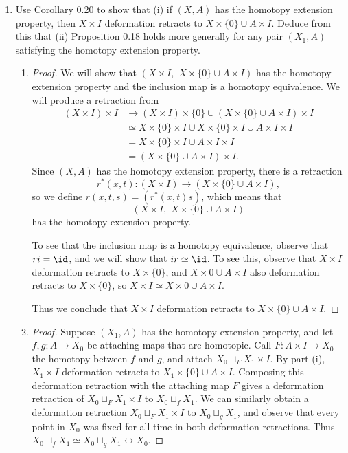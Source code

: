 \documentclass[12pt,letterpaper]{article}
\begin{document}
\begin{enumerate}
\item Use Corollary 0.20 to show that (i) if $(X, A)$ has the homotopy extension property, then $X\times I$ deformation retracts to $X\times\{0\} \cup A\times I$. Deduce from this that (ii) Proposition 0.18 holds more generally for any pair $(X_1, A)$ satisfying the homotopy extension property.
\begin{enumerate}
\item 
\begin{proof}
We will show that $(X\times I,\,\, X\times \{0\} \cup A \times I)$ has the homotopy extension property and the inclusion map is a homotopy equivalence. We will produce a retraction from 
\begin{align*}
(X\times I) \times I &\to (X\times I)\times \{0\} \cup (X\times \{0\} \cup A \times I)\times I\\
&\simeq X\times \{0\}\times I \cup X\times \{0\}\times I \cup A\times I \times I\\
&=X\times \{0\}\times I \cup A\times I \times I\\
&= (X\times \{0\} \cup A\times I)\times I.
\end{align*}
Since $(X,A)$ has the homotopy extension property, there is a retraction 
$$r^*(x,t):(X\times I) \to (X\times \{0\} \cup A\times I),$$ 
so we define $r(x,t,s)=(r^*(x,t)s)$, which means that 
$$({X\times I},\,\, {X\times \{0\} \cup A \times I})$$ 
has the homotopy extension property. 

To see that the inclusion map is a homotopy equivalence, observe that $ri= \id$, and we will show that $ir\simeq \id$. To see this, observe that $X\times I$ deformation retracts to $X\times\{0\}$, and $X\times {0} \cup A\times I$ also deformation retracts to $X\times\{0\}$, so $X\times I\simeq X\times {0} \cup A\times I$. 

Thus we conclude that $X\times I$ deformation retracts to $X\times\{0\} \cup A\times I$.
\end{proof}
\item 
\begin{proof}
Suppose $(X_1,A)$ has the homotopy extension property, and let $f,g:A\to X_0$ be attaching maps that are homotopic. Call $F:A\times I \to X_0$ the homotopy between $f$ and $g$, and attach $X_0 \sqcup_F X_1\times I$.
\pagebreak 
By part (i), $X_1\times I$ deformation retracts to $X_1\times \{0\} \cup A\times	I$. 
Composing this deformation retraction with the attaching map $F$ gives a deformation retraction of $X_0 \sqcup_F X_1\times I$ to $X_0\sqcup_f X_1$. We can similarly obtain a deformation retraction $X_0 \sqcup_F X_1\times I$ to $X_0\sqcup_g X_1$, and observe that every point in $X_0$ was fixed for all time in both deformation retractions. Thus $X_0\sqcup_fX_1\simeq X_0\sqcup_g X_1 \rel X_0$. 
\end{proof}

\end{enumerate}

\end{enumerate}
\vfill
\end{document}
